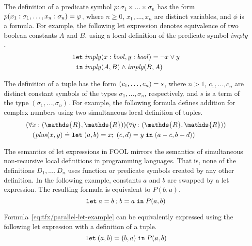 The definition of a predicate symbol $p:\sigma_1\times\ldots\times\sigma_n$ has 
the form ${p(x_1:\sigma_1,\ldots,x_n:\sigma_n)}={\varphi}$, where 
$n \geq 0$, $x_1,\ldots,x_n$ are distinct variables, and $\phi$ is a formula.
For example, the following let expression denotes equivalence of two boolean 
constants $A$ and $B$, using a local definition of the predicate symbol 
$\mathit{imply}$.
\begin{equation}\label{eq:tfx/fool-let-imply2}
\begin{aligned}
\mathtt{let}\;&{\mathit{imply}(x:\mathit{bool},y:\mathit{bool})}={\neg x \lor y}\\
 \mathtt{in}\;&\mathit{imply}(A,B)\wedge\mathit{imply}(B,A)
\end{aligned}
\end{equation}

The definition of a tuple has the form ${(c_1,\ldots,c_n)}={s}$, where
$n > 1$, $c_1,\ldots,c_n$ are distinct constant symbols of the types
$\sigma_1,\ldots,\sigma_n$, respectively, and $s$ is a term of the type
$(\sigma_1,\ldots,\sigma_n)$. 
For example, the following formula defines addition for complex numbers using 
two simultaneous local definition of tuples.
\begin{equation}\label{eq:tfx/fool-tuple-let}
  \begin{aligned}
  &(\forall x:(\mathds{R},\mathds{R}))(\forall y:(\mathds{R},\mathds{R}))\\
  &\quad(\mathit{plus}(x,y)\eql\letinpar{(a,b)}{x}{(c,d)}{y}{\tuple{a+c,b+d})}
  \end{aligned}
\end{equation}

The semantics of let expressions in FOOL mirrors the semantics of
simultaneous non-recursive local definitions in programming languages. 
That is, none of the definitions $D_1,\ldots,\allowbreak D_n$ uses function or
predicate symbols created by any other definition. 
In the following example, constants $a$ and $b$ are swapped by a let 
expression. 
The resulting formula is equivalent to $P(b, a)$.
\begin{equation}\label{eq:tfx/parallel-let-example}
\mathtt{let}\;{a}={b}\,;\,{b}={a}\;\mathtt{in}\;P(a, b)
\end{equation}

Formula~\ref{eq:tfx/parallel-let-example} can be equivalently expressed using 
the following let expression with a definition of a tuple.
\begin{equation}\label{eq:tfx/parallel-let-tuple-example}
\mathtt{let}\;{(a,b)}={(b,a)}\;\mathtt{in}\;P(a, b)
\end{equation}


